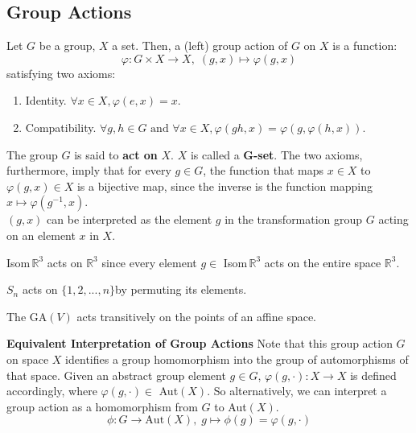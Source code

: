 \subsection{Group Actions}

  \begin{definition}
    Let $G$ be a group, $X$ a set. Then, a (left) group action of $G$ on $X$ is a function: 
    \begin{equation}
      \varphi: G \times X \longrightarrow X, \; (g,x) \longmapsto \varphi(g,x)
    \end{equation}
    satisfying two axioms:
    \begin{enumerate}
      \item Identity. $\forall x \in X, \varphi(e, x) = x$. 
      \item Compatibility. $\forall g, h \in G \text{ and } \forall x \in X, \varphi(gh, x) = \varphi(g, \varphi(h, x))$.
    \end{enumerate}
    The group $G$ is said to \textbf{act on} $X$. $X$ is called a \textbf{G-set}. The two axioms, furthermore, imply that for every $g \in G$, the function that maps $x \in X$ to $ \varphi(g, x) \in X$ is a bijective map, since the inverse is the function mapping $x \mapsto \varphi(g^{-1}, x)$. \\
    $(g, x)$ can be interpreted as the element $g$ in the transformation group $G$ acting on an element $x$ in $X$.
  \end{definition}

  \begin{example}
    Isom$\,\mathbb{R}^{3}$ acts on $\mathbb{R}^{3}$ since every element $g \in$ Isom$\,\mathbb{R}^{3}$ acts on the entire space $\mathbb{R}^{3}$. 
  \end{example}

  \begin{example}
    $S_n$ acts on $\{1, 2, ..., n\}$by permuting its elements.
  \end{example}

  \begin{example}
    The GA$(V)$ acts transitively on the points of an affine space.
  \end{example}

  \textbf{Equivalent Interpretation of Group Actions}
  Note that this group action $G$ on space $X$ identifies a group homomorphism into the group of automorphisms of that space. Given an abstract group element $g \in G$, $\varphi(g, \cdot): X \longrightarrow X$ is defined accordingly, where $\varphi(g, \cdot) \in $ Aut$(X)$. So alternatively, we can interpret a group action as a homomorphism from $G$ to Aut$(X)$. 
  \begin{equation}
    \phi: G \longrightarrow \text{Aut}(X), \; g \mapsto \phi(g) = \varphi(g,\cdot)
  \end{equation}

